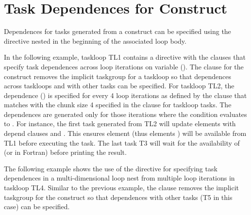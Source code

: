 \section{Task Dependences for  Construct}
\label{sec:taskloop_depend}


Dependences for tasks generated from a  construct can
be specified using the  directive nested in
the beginning of the associated loop body.

In the following example, taskloop TL1 contains
a  directive with the  clauses
that specify task dependences across loop iterations on variable 
().
The  clause for the  construct removes 
the implicit taskgroup for a taskloop so that dependences across taskloops and 
with other tasks can be specified.
For taskloop TL2, the dependence ()
is specified for every 4 loop iterations
as defined by the  clause that matches with
the chunk size 4 specified in the  clause for taskloop tasks.
The dependences are generated only for those iterations where
the  condition evaluates to .
For instance, the first task generated from TL2 will update elements
 with depend clauses  
and . This ensures element 
(thus elements ) will be available from TL1 before executing
the task.
The last task T3 will wait for the availability of 
(or  in Fortran) before printing the result.



The following example shows the use of the 
directive for specifying task dependences in a multi-dimensional loop nest
from multiple loop iterations in taskloop TL4.
Similar to the previous example, the  clause removes
the implicit taskgroup for the  construct so that 
dependences with other tasks (T5 in this case) can be specified.


